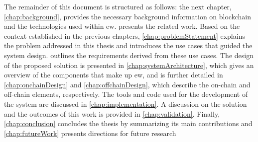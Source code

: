 The remainder of this document is structured as follows: the next chapter, \cref{chap:background}, provides the necessary background information on blockchain and the technologies used within \acrshort{ew}.  presents the related work. Based on the context established in the previous chapters, \cref{chap:problemStatement} explains the problem addressed in this thesis and introduces the use cases that guided the system design.  outlines the requirements derived from these use cases.
The design of the proposed solution is presented in \cref{chap:systemArchitecture}, which gives an overview of the components that make up \acrshort{ew}, and is further detailed in \cref{chap:onchainDesign} and \cref{chap:offchainDesign}, which describe the on-chain and off-chain elements, respectively. The tools and code used for the development of the system are discussed in \cref{chap:implementation}.
A discussion on the solution and the outcomes of this work is provided in \cref{chap:validation}. Finally, \cref{chap:conclusion}  concludes the thesis by summarizing its main contributions and \cref{chap:futureWork} presents directions for future research